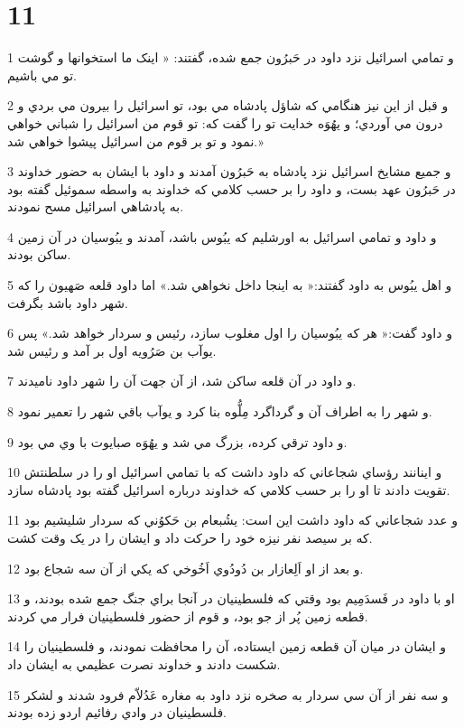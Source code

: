 \chapter{11}

\par 1 و تمامي اسرائيل نزد داود در حَبرُون جمع شده، گفتند: « اينک ما استخوانها و گوشت تو مي باشيم.
\par 2 و قبل از اين نيز هنگامي که شاؤل پادشاه مي بود، تو اسرائيل را بيرون مي بردي و درون مي آوردي؛ و يهُوَه خدايت تو را گفت که: تو قوم من اسرائيل را شباني خواهي نمود و تو بر قوم من اسرائيل پيشوا خواهي شد.»
\par 3 و جميع مشايخ اسرائيل نزد پادشاه به حَبرُون آمدند و داود با ايشان به حضور خداوند در حَبرُون عهد بست، و داود را بر حسب کلامي که خداوند به واسطه سموئيل گفته بود به پادشاهي اسرائيل مسح نمودند.
\par 4 و داود و تمامي اسرائيل به اورشليم که يبُوس باشد، آمدند و يبُوسيان در آن زمين ساکن بودند.
\par 5 و اهل يبُوس به داود گفتند:« به اينجا داخل نخواهي شد.» اما داود قلعه صَهيون را که شهر داود باشد بگرفت.
\par 6 و داود گفت:« هر که يبُوسيان را اول مغلوب سازد، رئيس و سردار خواهد شد.» پس يوآب بن صَرُويه اول بر آمد و رئيس شد.
\par 7 و داود در آن قلعه ساکن شد، از آن جهت آن را شهر داود ناميدند.
\par 8 و شهر را به اطراف آن و گرداگرد مِلُّوه بنا کرد و يوآب باقي شهر را تعمير نمود.
\par 9 و داود ترقي کرده، بزرگ مي شد و يهُوَه صبايوت با وي مي بود.
\par 10 و اينانند رؤساي شجاعاني که داود داشت که با تمامي اسرائيل او را در سلطنتش تقويت دادند تا او را بر حسب کلامي که خداوند درباره اسرائيل گفته بود پادشاه سازد.
\par 11 و عدد شجاعاني که داود داشت اين است: يشُبعام بن حَکوُني که سردار شليشيم بود که بر سيصد نفر نيزه خود را حرکت داد و ايشان را در يک وقت کشت.
\par 12 و بعد از او اَلِعازار بن دُودُوي اَخُوخي که يکي از آن سه شجاع بود.
\par 13 او با داود در فَسدَمِيم بود وقتي که فلسطينيان در آنجا براي جنگ جمع شده بودند، و قطعه زمين پُر از جو بود، و قوم از حضور فلسطينيان فرار مي کردند.
\par 14 و ايشان در ميان آن قطعه زمين ايستاده، آن را محافظت نمودند، و فلسطينيان را شکست دادند و خداوند نصرت عظيمي به ايشان داد.
\par 15 و سه نفر از آن سي سردار به صخره نزد داود به مغاره عَدُلاّم فرود شدند و لشکر فلسطينيان در وادي رفائيم اردو زده بودند.
